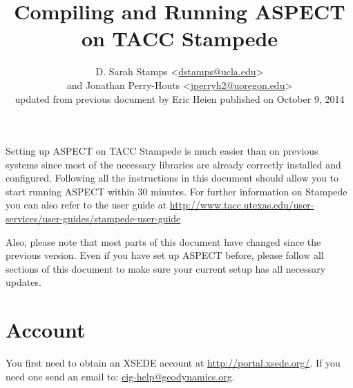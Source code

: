 \documentclass{article}
\newcommand{\aspect}{\textsc{ASPECT}}
\begin{document}
\title{Compiling and Running \aspect{} on TACC Stampede}
\author{D. Sarah Stamps \textless\url{dstamps@ucla.edu}\textgreater \\
and Jonathan Perry-Houts \textless\url{jperryh2@uoregon.edu}\textgreater\\
updated from previous document by Eric Heien published on October 9, 2014}

\maketitle



Setting up \aspect{} on TACC Stampede is much easier than on previous systems since
most of the necessary libraries are already correctly installed and configured. Following all
the instructions in this document should allow you to start running \aspect{} within 30
minutes. For further information on Stampede you can also refer to the user guide at
\url{http://www.tacc.utexas.edu/user-services/user-guides/stampede-user-guide} 

Also, please note that most parts of this document have changed since the previous
version. Even if you have set up \aspect{} before, please follow all sections of this document
to make sure your current setup has all necessary updates.


\section{Account}
You first need to obtain an XSEDE account at \url{http://portal.xsede.org/}. If you need one send an email to: \url{cig-help@geodynamics.org}.  
\end{document}

